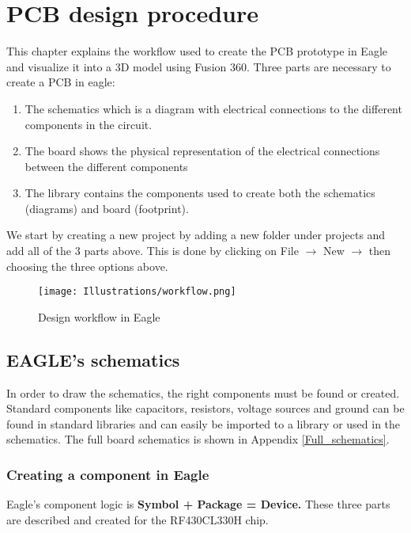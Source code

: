 
\chapter{PCB design procedure}
This chapter explains the workflow used to create the PCB prototype in Eagle and visualize it into a 3D model using Fusion 360. 
Three parts are necessary to create a PCB in eagle:
\begin{enumerate}
\item The schematics which is a diagram with electrical connections to the different components in the circuit.  
\item The board shows the physical representation of the electrical connections between the different components
\item The library contains the components used to create both the schematics (diagrams) and board (footprint).
\end{enumerate}

We start by creating a new project by adding a new folder under projects and add all of the 3 parts above.
This is done by clicking on File $\rightarrow$ New $\rightarrow$ then choosing the three options above. 

\begin{figure}[h]
\begin{center}
\center
\texttt{[image: Illustrations/workflow.png]}  
\caption{Design workflow in Eagle}
\label{block diagram}
\end{center}
\end{figure}

\section{EAGLE’s schematics}
In order to draw the schematics, the right components must be found or created.  Standard components like capacitors, resistors, voltage sources and ground can be found in standard libraries and can easily be imported to a library or used in the schematics. The full board schematics is shown in Appendix \ref{Full_schematics}. 


\subsection{Creating a component in Eagle}
Eagle's component logic is \textbf{Symbol + Package = Device.} These three parts are described and created for the RF430CL330H chip.

